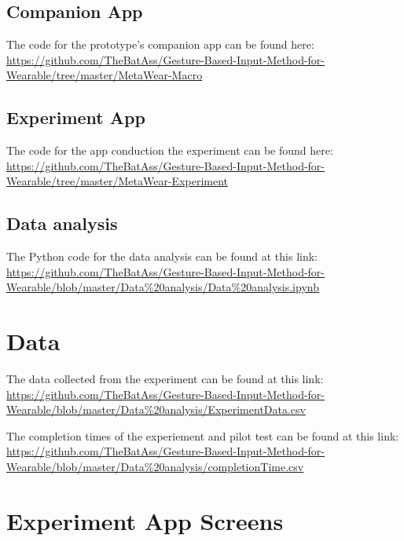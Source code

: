 \section{Companion App}\label{metawear_macro}
The code for the prototype's companion app  can be found here:\\
\url{https://github.com/TheBatAss/Gesture-Based-Input-Method-for-Wearable/tree/master/MetaWear-Macro}

\section{Experiment App}\label{metawear_experiment}
The code for the app  conduction the experiment can be found here:\\
\url{https://github.com/TheBatAss/Gesture-Based-Input-Method-for-Wearable/tree/master/MetaWear-Experiment}

\section{Data analysis}\label{data_anal_code}
The Python code for the data analysis can be found at this link:\\
\url{https://github.com/TheBatAss/Gesture-Based-Input-Method-for-Wearable/blob/master/Data\%20analysis/Data\%20analysis.ipynb}





\chapter{Data}\label{ex_data_appendix}
The data collected from the experiment can be found at this link:\\
\url{https://github.com/TheBatAss/Gesture-Based-Input-Method-for-Wearable/blob/master/Data\%20analysis/ExperimentData.csv}

The completion times of the experiement and pilot test can be found at this link:\\
\url{https://github.com/TheBatAss/Gesture-Based-Input-Method-for-Wearable/blob/master/Data\%20analysis/completionTime.csv}



























\chapter{Experiment App Screens}\label{ex_app_screens}
